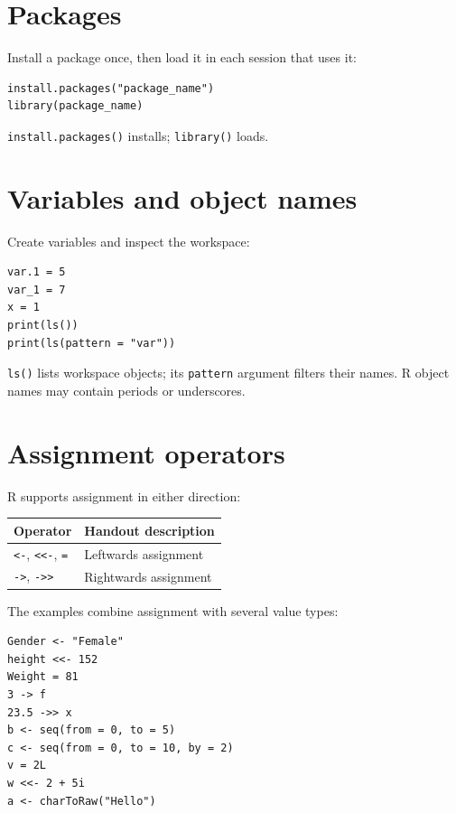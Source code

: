 \section{Packages}

Install a package once, then load it in each session that uses it:

\begin{lstlisting}[style=dsr]
install.packages("package_name")
library(package_name)
\end{lstlisting}

\texttt{install.packages()} installs; \texttt{library()} loads.

\section{Variables and object names}

Create variables and inspect the workspace:

\begin{lstlisting}[style=dsr]
var.1 = 5
var_1 = 7
x = 1
print(ls())
print(ls(pattern = "var"))
\end{lstlisting}

\texttt{ls()} lists workspace objects; its \texttt{pattern} argument filters their names. R object names may contain periods or underscores.

\section{Assignment operators}

R supports assignment in either direction:

\begin{dstable}
\begin{tabularx}{\linewidth}{@{}p{3.3cm}X@{}}
\toprule
\rowcolor{DSPaleBlue!92}
Operator & Handout description \\
\midrule
\texttt{<-}, \texttt{<<-}, \texttt{=} & Leftwards assignment \\
\texttt{->}, \texttt{->>} & Rightwards assignment \\
\bottomrule
\end{tabularx}
\end{dstable}

The examples combine assignment with several value types:

\begin{lstlisting}[style=dsr]
Gender <- "Female"
height <<- 152
Weight = 81
3 -> f
23.5 ->> x
b <- seq(from = 0, to = 5)
c <- seq(from = 0, to = 10, by = 2)
v = 2L
w <<- 2 + 5i
a <- charToRaw("Hello")
\end{lstlisting}

